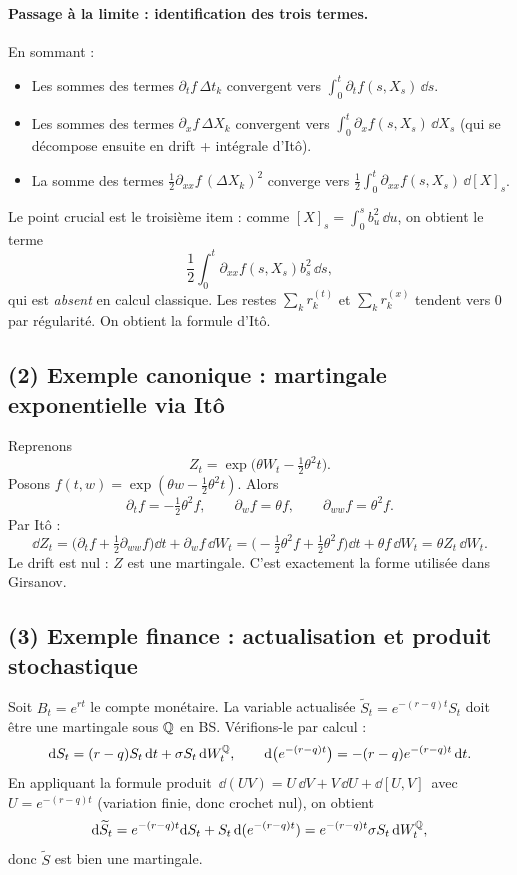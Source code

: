 \paragraph{Passage à la limite : identification des trois termes.}
En sommant :
\begin{itemize}[leftmargin=*]
\item Les sommes des termes $\partial_t f\,\Delta t_k$ convergent vers $\int_0^t \partial_t f(s,X_s)\,\dd s$.
\item Les sommes des termes $\partial_x f\,\Delta X_k$ convergent vers $\int_0^t \partial_x f(s,X_s)\,\dd X_s$ (qui se décompose ensuite en drift + intégrale d'Itô).
\item La somme des termes $\frac12\partial_{xx}f\,(\Delta X_k)^2$ converge vers $\frac12\int_0^t \partial_{xx} f(s,X_s)\,\dd[X]_s$.
\end{itemize}
Le point crucial est le troisième item : comme $[X]_s=\int_0^s b_u^2\,\dd u$, on obtient le terme
\[
\frac12\int_0^t \partial_{xx}f(s,X_s)b_s^2\,\dd s,
\]
qui est \emph{absent} en calcul classique.
Les restes $\sum_k r_k^{(t)}$ et $\sum_k r_k^{(x)}$ tendent vers 0 par régularité.
On obtient la formule d'Itô.

\subsection*{(2) Exemple canonique : martingale exponentielle via Itô}
Reprenons
\[
Z_t=\exp\Big(\theta W_t-\tfrac12\theta^2 t\Big).
\]
Posons $f(t,w)=\exp(\theta w-\tfrac12\theta^2 t)$.
Alors
\[
\partial_t f=-\tfrac12\theta^2 f,\qquad \partial_w f=\theta f,\qquad \partial_{ww}f=\theta^2 f.
\]
Par Itô :
\[
\dd Z_t = \Big(\partial_t f+\tfrac12\partial_{ww}f\Big)\dd t + \partial_w f\,\dd W_t
=\Big(-\tfrac12\theta^2 f+\tfrac12\theta^2 f\Big)\dd t + \theta f\,\dd W_t
=\theta Z_t\,\dd W_t.
\]
Le drift est nul : $Z$ est une martingale. C'est exactement la forme utilisée dans Girsanov.

\subsection*{(3) Exemple finance : actualisation et produit stochastique}
Soit $B_t=e^{rt}$ le compte monétaire.
La variable actualisée $\widetilde S_t=e^{-(r-q)t}S_t$ doit être une martingale sous $\mathbb{Q}$ en BS.
Vérifions-le par calcul :
\[
\mathrm{d} S_t=(r-q)S_t\,\mathrm{d} t+\sigma S_t\,\mathrm{d} W_t^{\mathbb{Q}},
\qquad
\mathrm{d}\big(e^{-(r-q)t}\big)=-(r-q)e^{-(r-q)t}\,\mathrm{d} t.
\]
En appliquant la formule produit $\,\dd(UV)=U\,\dd V+V\,\dd U+\dd[U,V]\,$ avec $U=e^{-(r-q)t}$ (variation finie, donc crochet nul), on obtient
\[
\mathrm{d}\widetilde S_t
=e^{-(r-q)t}\mathrm{d} S_t+S_t\,\mathrm{d}(e^{-(r-q)t})
=e^{-(r-q)t}\sigma S_t\,\mathrm{d} W_t^{\mathbb{Q}},
\]
donc $\widetilde S$ est bien une martingale.

